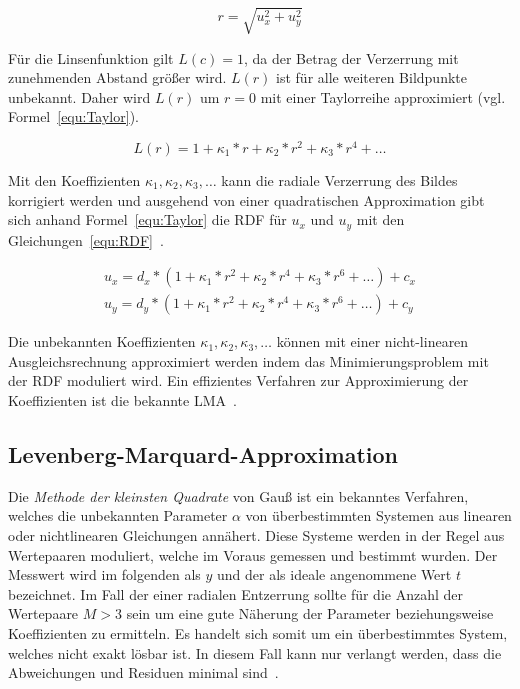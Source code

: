 \begin{equation}
\label{equ:Abstand}
r = \sqrt{u_x^2+u_y^2}
\end{equation}

 Für die Linsenfunktion gilt $L(c)=1$, da der Betrag der Verzerrung mit zunehmenden Abstand größer wird. $L(r)$ ist für alle weiteren Bildpunkte unbekannt. Daher wird $L(r)$ um $r=0$ mit einer Taylorreihe approximiert (vgl. Formel~\ref{equ:Taylor}). 
 
 \begin{equation}
 \label{equ:Taylor}
 L(r)=1+\kappa_1*r+\kappa_2*r^2+\kappa_3*r^4 + \dots
 \end{equation}

Mit den Koeffizienten $\kappa_1, \kappa_2, \kappa_3, \dots$ kann die radiale Verzerrung des Bildes korrigiert werden und ausgehend von einer quadratischen Approximation gibt sich anhand Formel~\ref{equ:Taylor} die RDF für $u_x$ und $u_y$ mit den Gleichungen~\ref{equ:RDF}~\cite{WangRaddist}.

\begin{equation}
\label{equ:RDF}
\begin{split}
u_x = d_x*(1+\kappa_1*r^2+\kappa_2*r^4+\kappa_3*r^6 + \dots) + c_x\\
u_y = d_y*(1+\kappa_1*r^2+\kappa_2*r^4+\kappa_3*r^6 + \dots) + c_y
\end{split}
\end{equation}

Die unbekannten Koeffizienten $\kappa_1, \kappa_2, \kappa_3, \dots$ können mit einer nicht-linearen Ausgleichsrechnung approximiert werden indem das Minimierungsproblem mit der RDF moduliert wird. Ein effizientes Verfahren zur Approximierung der Koeffizienten ist die bekannte LMA~\cite{LevMarquardt}.
\subsection{Levenberg-Marquard-Approximation}
Die \textit{Methode der kleinsten Quadrate} von Gauß ist ein bekanntes Verfahren, welches die unbekannten Parameter $\alpha$ von überbestimmten Systemen aus linearen oder nichtlinearen Gleichungen annähert. Diese Systeme werden in der Regel aus Wertepaaren moduliert, welche im Voraus gemessen und bestimmt wurden. Der Messwert wird im folgenden als $y$ und der als ideale angenommene Wert $t$ bezeichnet.
Im Fall der einer radialen Entzerrung sollte für die Anzahl der Wertepaare $M>3$ sein um eine gute Näherung der Parameter beziehungsweise Koeffizienten zu ermitteln.
Es handelt sich somit um ein überbestimmtes System, welches nicht exakt lösbar ist. In diesem Fall kann nur verlangt werden, dass die Abweichungen und Residuen minimal sind~\cite{schwarz2011numerische}. 

